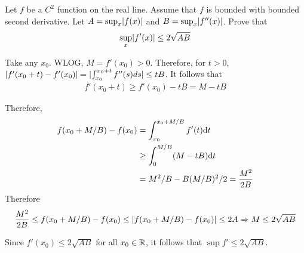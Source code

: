 \documentclass[a4paper, 12pt]{article}
\begin{document}
\begin{problem} 
Let $f$ be a $C^2$ function on the real line. Assume that $f$ is bounded with bounded second derivative. Let $A = \sup_x \lvert f(x)\rvert$ and $B = \sup_x \lvert f''(x)\rvert$. Prove that \begin{equation*}
\sup_x \lvert f'(x)\rvert \leq 2\sqrt{AB}
\end{equation*}
\end{problem}
\begin{solution}
    Take any $x_0$. WLOG, $M = f'(x_0) > 0$. Therefore, for $t > 0$, $\lvert f'(x_0 + t) - f'(x_0) \rvert = \lvert\int_{x_0}^{x_0+t} f''(s) ds\rvert \leq tB$. It follows that \begin{align*}
        f'(x_0 + t) \geq f'(x_0) - tB = M - tB
    \end{align*}

    Therefore, \begin{align*}
        f(x_0 + M/B) - f(x_0) &= \int_{x_0}^{x_0 + M/B} f'(t) \mathrm{d} t \\
                            &\geq \int_{0}^{M/B} (M-tB) \mathrm{d} t \\
                            &= M^2/B - B(M/B)^2/2 = \frac{M^2}{2B}
    \end{align*}
    Therefore \begin{equation*}
        \frac{M^2}{2B} \leq f(x_0 + M/B) - f(x_0) \leq \lvert f(x_0 + M/B) - f(x_0)\rvert \leq 2A \Rightarrow M \leq 2\sqrt{AB}
    \end{equation*}

    Since $f'(x_0) \leq 2\sqrt{AB}$ for all $x_0 \in \mathbb{R}$, it follows that $\sup f' \leq 2\sqrt{AB}$. 
\end{solution}
\end{document}
